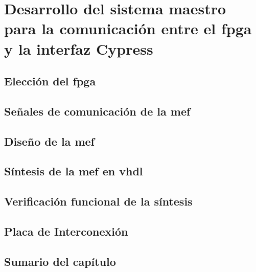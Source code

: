 \chapter{Desarrollo del sistema maestro para la comunicación entre el \acrshort{fpga} y la interfaz Cypress}
	\label{cap:fpga}
	
%		
	\section{Elección del \acrshort{fpga}}
		\label{mats:fpga}
		
	\section{Señales de comunicación de la \acrlong{mef}}
		\label{fpga:sigs}
		
	\section{Diseño de la \acrlong{mef}}
		
	\section{Síntesis de la \acrlong{mef} en \acrshort{vhdl}}
		
	\section{Verificación funcional de la síntesis}
		
	\section{Placa de Interconexión}
		
	\section{Sumario del capítulo}
		